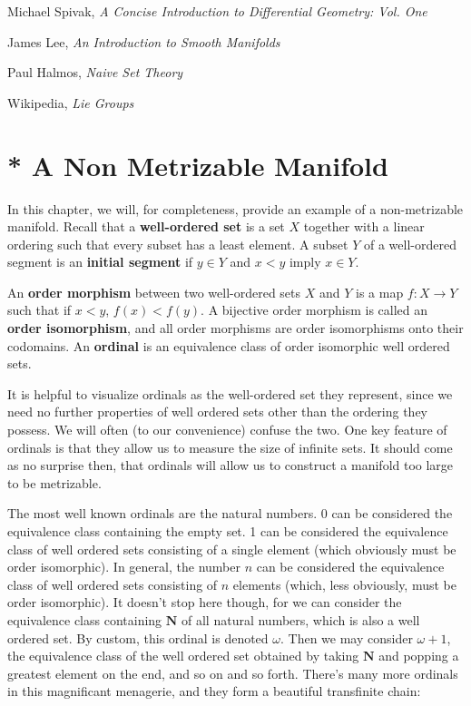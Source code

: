 \begin{thebibliography}{10}
     Michael Spivak,
    \emph{A Concise Introduction to Differential Geometry: Vol. One}

     James Lee,
    \emph{An Introduction to Smooth Manifolds}

     Paul Halmos,
    \emph{Naive Set Theory}

     Wikipedia,
    \emph{Lie Groups}
\end{thebibliography}













\section{* A Non Metrizable Manifold}

In this chapter, we will, for completeness, provide an example of a non-metrizable manifold. Recall that a {\bf well-ordered set} is a set $X$ together with a linear ordering such that every subset has a least element. A subset $Y$ of a well-ordered segment is an {\bf initial segment} if $y \in Y$ and $x < y$ imply $x \in Y$.

\begin{definition}
    An {\bf order morphism} between two well-ordered sets $X$ and $Y$ is a map $f:X \to Y$ such that if $x < y$, $f(x) < f(y)$. A bijective order morphism is called an {\bf order isomorphism}, and all order morphisms are order isomorphisms onto their codomains. An {\bf ordinal} is an equivalence class of order isomorphic well ordered sets.
\end{definition}

It is helpful to visualize ordinals as the well-ordered set they represent, since we need no further properties of well ordered sets other than the ordering they possess. We will often (to our convenience) confuse the two. One key feature of ordinals is that they allow us to measure the size of infinite sets. It should come as no surprise then, that ordinals will allow us to construct a manifold too large to be metrizable.

The most well known ordinals are the natural numbers. 0 can be considered the equivalence class containing the empty set. 1 can be considered the equivalence class of well ordered sets consisting of a single element (which obviously must be order isomorphic). In general, the number $n$ can be considered the equivalence class of well ordered sets consisting of $n$ elements (which, less obviously, must be order isomorphic). It doesn't stop here though, for we can consider the equivalence class containing $\mathbf{N}$ of all natural numbers, which is also a well ordered set. By custom, this ordinal is denoted $\omega$. Then we may consider $\omega + 1$, the equivalence class of the well ordered set obtained by taking $\mathbf{N}$ and popping a greatest element on the end, and so on and so forth. There's many more ordinals in this magnificant menagerie, and they form a beautiful transfinite chain:

